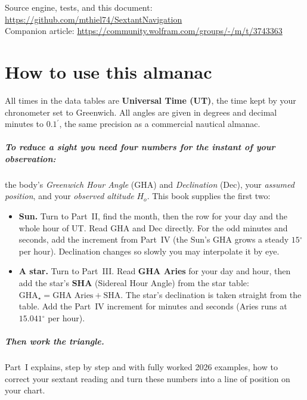 \documentclass[10pt,letterpaper,twoside]{book}
\newcommand{\dg}{\ensuremath{{}^{\circ}}}
\newcommand{\pr}{\ensuremath{{}^{\prime}}}
\begin{document}
\vfill
\begin{center}\small
Source engine, tests, and this document: \url{https://github.com/mthiel74/SextantNavigation}\\
Companion article: \url{https://community.wolfram.com/groups/-/m/t/3743363}
\end{center}
\clearpage

\chapter*{How to use this almanac}

All times in the data tables are \textbf{Universal Time (UT)}, the time kept by
your chronometer set to Greenwich. All angles are given in degrees and decimal
minutes to $0.1\pr$, the same precision as a commercial nautical almanac.

\paragraph{To reduce a sight you need four numbers for the instant of your
observation:} the body's \emph{Greenwich Hour Angle} (GHA) and \emph{Declination}
(Dec), your \emph{assumed position}, and your \emph{observed altitude} $H_o$.
This book supplies the first two:

\begin{itemize}[nosep]
\item \textbf{Sun.} Turn to Part~II, find the month, then the row for your day and
      the whole hour of UT. Read GHA and Dec directly. For the odd minutes and
      seconds, add the increment from Part~IV (the Sun's GHA grows a steady
      $15\dg$ per hour). Declination changes so slowly you may interpolate it by eye.
\item \textbf{A star.} Turn to Part~III. Read \textbf{GHA Aries} for your day and
      hour, then add the star's \textbf{SHA} (Sidereal Hour Angle) from the star
      table: $\text{GHA}_\star = \text{GHA Aries} + \text{SHA}$. The star's
      declination is taken straight from the table. Add the Part~IV increment for
      minutes and seconds (Aries runs at $15.041\dg$ per hour).
\end{itemize}

\paragraph{Then work the triangle.} Part~I explains, step by step and with fully
worked 2026 examples, how to correct your sextant reading and turn these numbers
into a line of position on your chart.
\end{document}
